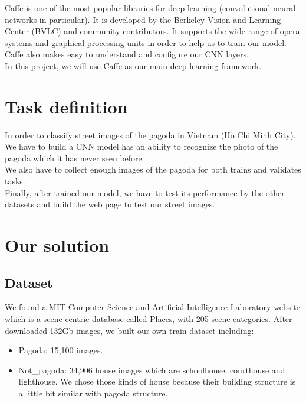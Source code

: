 Caffe is one of the most popular libraries for deep learning (convolutional neural networks in particular). It is developed by the Berkeley Vision and Learning Center (BVLC) and community contributors. It supports the wide range of opera systems and graphical processing units in order to help us to train our model.\\
Caffe also makes easy to understand and configure our CNN layers. \\
In this project, we will use Caffe as our main deep learning framework.

\section{Task definition}
In order to classify street images of the pagoda in Vietnam (Ho Chi Minh City). We have to build a CNN model has an ability to recognize the photo of the pagoda which it has never seen before. \\
We also have to collect enough images of the pagoda for both trains and validates tasks.\\
Finally, after trained our model, we have to test its performance by the other datasets and build the web page to test our street images.

\section{Our solution}
\subsection{Dataset}
We found a MIT Computer Science and Artificial Intelligence Laboratory website \cite{mit} which is a scene-centric database called Places, with 205 scene categories. After downloaded 132Gb images, we built our own train dataset including:
\begin{itemize}
\item Pagoda: 15,100 images.
\item Not\_pagoda: 34,906 house images which are schoolhouse, courthouse and lighthouse. We chose those kinds of house because their building structure is a little bit similar with pagoda structure.
\end{itemize}

